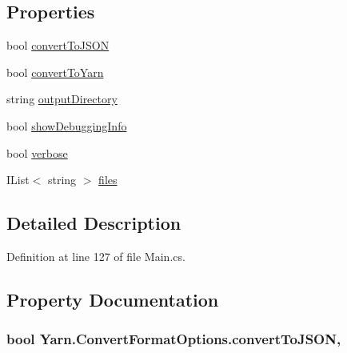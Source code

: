 \subsection*{Properties}
\begin{DoxyCompactItemize}
\item 
bool \hyperlink{a00052_a6a650914fcde92ba06fb5f140af27f11}{convert\-To\-J\-S\-O\-N}
\item 
bool \hyperlink{a00052_a052d6f00647c503adc5a79a1ff92cdf4}{convert\-To\-Yarn}
\item 
string \hyperlink{a00052_ab636bde93c2204b2af1a9306560d9749}{output\-Directory}
\item 
bool \hyperlink{a00035_a89964ea17bd19caf00cb5bff563ed01c}{show\-Debugging\-Info}
\item 
bool \hyperlink{a00035_ada4d83d1756918f362d55f6649b82b17}{verbose}
\item 
I\-List$<$ string $>$ \hyperlink{a00035_aa93cbb1bc1d5328e0a417012621e92d2}{files}
\end{DoxyCompactItemize}


\subsection{Detailed Description}


Definition at line 127 of file Main.\-cs.



\subsection{Property Documentation}
\hypertarget{a00052_a6a650914fcde92ba06fb5f140af27f11}{
\subsubsection[{convert\-To\-J\-S\-O\-N}]{\setlength{\rightskip}{0pt plus 5cm}bool Yarn.\-Convert\-Format\-Options.\-convert\-To\-J\-S\-O\-N\hspace{0.3cm}{\ttfamily [get]}, {\ttfamily [set]}}}\label{a00052_a6a650914fcde92ba06fb5f140af27f11}


